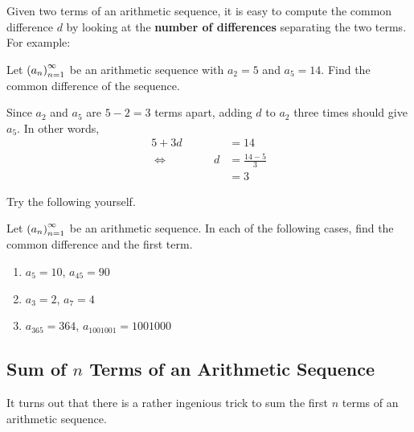 Given two terms of an arithmetic sequence, it is easy to compute the common difference $d$ by looking at the \textbf{number of differences} separating the two terms. For example:

\begin{boxexample}
Let $\left( a_n \right)_{n=1}^{\infty}$ be an arithmetic sequence with $a_2 = 5$ and $a_5 = 14$. Find the common difference of the sequence.
\begin{solution}
Since $a_2$ and $a_5$ are $5 - 2 = 3$ terms apart, adding $d$ to $a_2$ three times should give $a_5$. In other words,
\begin{align*}
    5 + 3d &= 14 \\
    \iff \quad \quad \quad \quad d &= \frac{14 - 5}{3} \\
    &= 3
\end{align*}
\end{solution}
\vspace{-3em}
\end{boxexample}

Try the following yourself.

\begin{boxexercise}
Let $\left( a_n \right)_{n=1}^{\infty}$ be an arithmetic sequence. In each of the following cases, find the common difference and the first term.
\begin{enumerate}[noitemsep]
    \item $a_5 = 10$, $a_{45} = 90$
    \item $a_3 = 2$, $a_7 = 4$
    \item $a_{365} = 364$, $a_{1001001} = 1001000$
\end{enumerate}
\end{boxexercise}

\subsection{Sum of $n$ Terms of an Arithmetic Sequence}

It turns out that there is a rather ingenious trick to sum the first $n$ terms of an arithmetic sequence.

